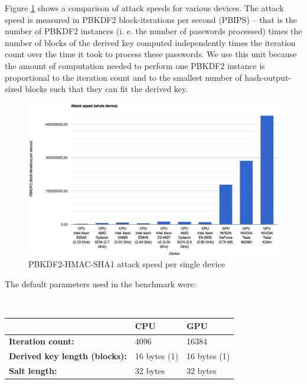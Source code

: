 \documentclass[12pt,oneside]{fithesis2}
\begin{document}
      Figure \ref{graph:devices:speed} shows a comparison of attack speeds for various devices. The attack speed is measured in PBKDF2 block-iterations per second (PBIPS) -- that is the number of PBKDF2 instances (i. e. the number of passwords processed) times the number of blocks of the derived key computed independently times the iteration count over the time it took to process these passwords. We use this unit because the amount of computation needed to perform one PBKDF2 instance is proportional to the iteration count and to the smallest number of hash-output-sized blocks such that they can fit the derived key.
      
      \begin{figure}
        \centering
        \includegraphics[width=\linewidth, clip=true, trim=1.5cm 0cm 2cm 3cm]{images/devices-raw-speed-whole.eps}
        \caption{PBKDF2-HMAC-SHA1 attack speed per single device}
        \label{graph:devices:speed}
      \end{figure}
      
      The default parameters used in the benchmark were:
      
      ~
      
      \begin{tabular}{l||l|l}
        & \textbf{CPU} & \textbf{GPU} \\
        \hline\hline
        \textbf{Iteration count:} & 4096 & 16384 \\
        \textbf{Derived key length (blocks):} & 16 bytes (1) & 16 bytes (1) \\
        \textbf{Salt length:} & 32 bytes & 32 bytes
      \end{tabular}
      
      ~
      
\end{document}

